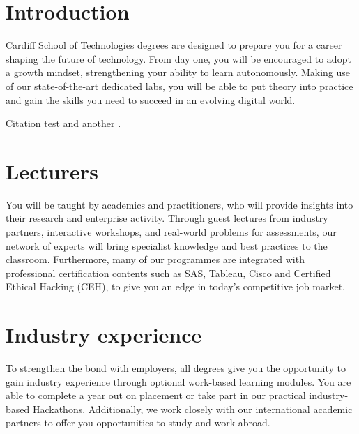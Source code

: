 \documentclass{article}
\begin{document}
\newpage %

\maketitle %

\tableofcontents

\section{Introduction}
Cardiff School of Technologies degrees are designed to prepare you for a
career shaping the future of technology. From day one, you will be
encouraged to adopt a growth mindset, strengthening your ability to learn
autonomously. Making use of our state-of-the-art dedicated labs, you will
be able to put theory into practice and gain the skills you need to succeed
in an evolving digital world.

Citation test \cite{JenkinsAndAngel2006} and another \citep{JenkinsAndAngel2006}.

\section{Lecturers}
You will be taught by academics and practitioners, who will provide insights
into their research and enterprise activity. Through guest lectures from
industry partners, interactive workshops, and real-world problems for
assessments, our network of experts will bring specialist knowledge and best
practices to the classroom. Furthermore, many of our programmes are integrated
with professional certification contents such as SAS, Tableau, Cisco and
Certified Ethical Hacking (CEH), to give you an edge in today’s competitive job
market. 

\section{Industry experience}
To strengthen the bond with employers, all degrees give you the
opportunity to gain industry experience through optional work-based
learning modules. You are able to complete a year out on placement or take
part in our practical industry-based Hackathons. Additionally, we work
closely with our international academic partners to offer you
opportunities to study and work abroad.

 




\end{document}
